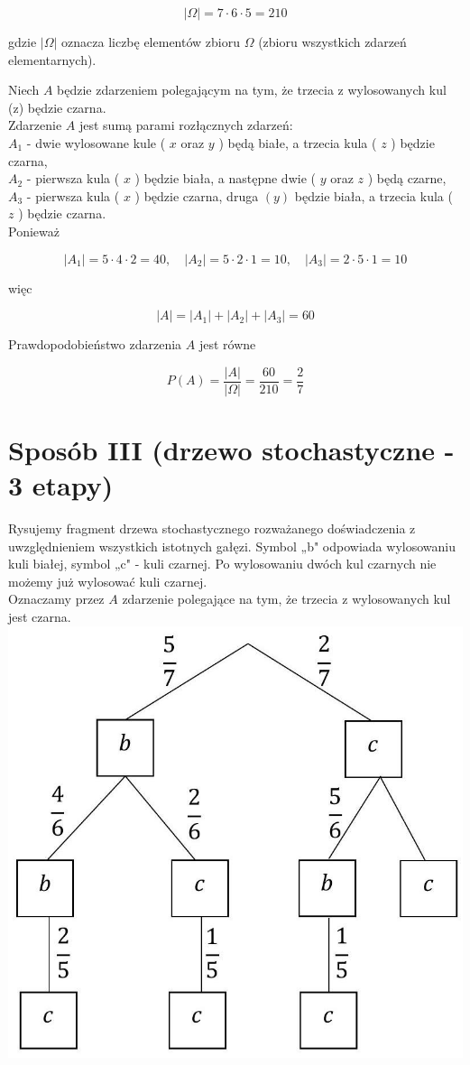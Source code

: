 \documentclass[10pt]{article}
\begin{document}
$$
|\Omega|=7 \cdot 6 \cdot 5=210
$$

gdzie $|\Omega|$ oznacza liczbę elementów zbioru $\Omega$ (zbioru wszystkich zdarzeń elementarnych).

Niech $A$ będzie zdarzeniem polegającym na tym, że trzecia z wylosowanych kul (z) będzie czarna.\\
Zdarzenie $A$ jest sumą parami rozłącznych zdarzeń:\\
$A_{1}$ - dwie wylosowane kule ( $x$ oraz $y$ ) będą białe, a trzecia kula ( $z$ ) będzie czarna,\\
$A_{2}$ - pierwsza kula ( $x$ ) będzie biała, a następne dwie ( $y$ oraz $z$ ) będą czarne,\\
$A_{3}$ - pierwsza kula ( $x$ ) będzie czarna, druga $(y)$ będzie biała, a trzecia kula ( $z$ ) będzie czarna.\\
Ponieważ

$$
\left|A_{1}\right|=5 \cdot 4 \cdot 2=40, \quad\left|A_{2}\right|=5 \cdot 2 \cdot 1=10, \quad\left|A_{3}\right|=2 \cdot 5 \cdot 1=10
$$

więc

$$
|A|=\left|A_{1}\right|+\left|A_{2}\right|+\left|A_{3}\right|=60
$$

Prawdopodobieństwo zdarzenia $A$ jest równe

$$
P(A)=\frac{|A|}{|\Omega|}=\frac{60}{210}=\frac{2}{7}
$$

\section*{Sposób III (drzewo stochastyczne - 3 etapy)}
Rysujemy fragment drzewa stochastycznego rozważanego doświadczenia z uwzględnieniem wszystkich istotnych gałęzi. Symbol „b" odpowiada wylosowaniu kuli białej, symbol „c" - kuli czarnej. Po wylosowaniu dwóch kul czarnych nie możemy już wylosować kuli czarnej.\\
Oznaczamy przez $A$ zdarzenie polegające na tym, że trzecia z wylosowanych kul jest czarna.\\
\includegraphics[max width=\textwidth, center]{2025_02_07_dcb3d059df06a3930b0ag-17}
\end{document}
